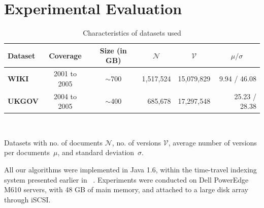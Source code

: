
\section{Experimental Evaluation}
\label{sec:eval}
\begin{table}
  \center
  \begin{tabular}{l c c r r r} 
      \toprule
      { Dataset} & \multicolumn{1}{c}{Coverage}&  \multicolumn{1}{c}{Size (in GB)} & \multicolumn{1}{c}{$\mathcal{N}$} & \multicolumn{1}{c}{$\mathcal{V}$} & \multicolumn{1}{c}{$\mu / \sigma$}\\
      \midrule
      {\bf WIKI} & 2001  to 2005  & $\sim$700 & 1,517,524 & 15,079,829 & 9.94 / 46.08\\

      {\bf UKGOV} & 2004 to 2005 & $\sim$400 & 685,678 & 17,297,548 & 25.23 / 28.38\\
      \bottomrule
    \end{tabular}\\
    \hspace*{2ex}\parbox{0.65\textwidth}{\fontsize{8pt}{8pt}\sffamily Datasets with no. of documents $\mathcal{N}$,
    no. of versions $\mathcal{V}$, average number of versions per documents~${\mu}$, and standard deviation~${\sigma}$.}
  \caption{Characteristics of datasets used}
  \label{tab:datasets}
\end{table}







All our algorithms were implemented in Java 1.6, within the
time-travel indexing system presented earlier in
~\cite{aanand:sigir2011}.  Experiments were conducted on Dell
PowerEdge M610 servers, with 48 GB of main memory, and attached to a
large disk array through iSCSI.

